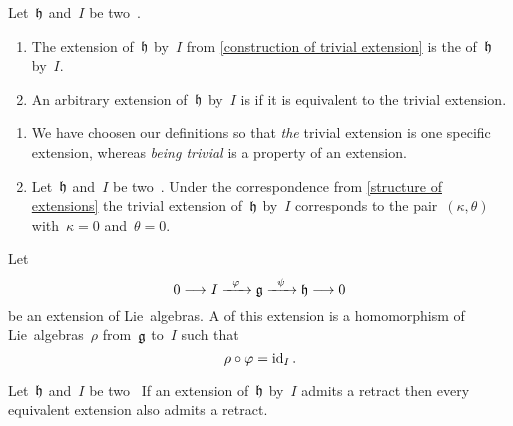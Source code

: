 \begin{definition}
  Let~$\mathfrak{h}$ and~$I$ be two~\liealgebras{$\kf$}.
  \begin{enumerate}
    \item
      The extension of~$\mathfrak{h}$ by~$I$ from \cref{construction of trivial extension} is the  of~$\mathfrak{h}$ by~$I$.
    \item
      An arbitrary extension of~$\mathfrak{h}$ by~$I$ is  if it is equivalent to the trivial extension.
  \end{enumerate}
\end{definition}


\begin{remark}
  \leavevmode
  \begin{enumerate}
    \item
      We have choosen our definitions so that \emph{the} trivial extension is one specific extension, whereas \emph{being trivial} is a property of an extension.
    \item
      Let~$\mathfrak{h}$ and~$I$ be two~\liealgebras{$\kf$}.
      Under the correspondence from \cref{structure of extensions} the trivial extension of~$\mathfrak{h}$ by~$I$ corresponds to the pair~$(\kappa, \theta)$ with~$\kappa = 0$ and~$\theta = 0$.
  \end{enumerate}
\end{remark}


\begin{definition}
  Let
  \[
    0
    \to
    I
    \xto{\varphi}
    \glie
    \xto{\psi}
    \hlie
    \to
    0
  \]
  be an extension of Lie~algebras.
  A   of this extension is a homomorphism of Lie~algebras~$\rho$ from~$\mathfrak{g}$ to~$I$ such that
  \[
    \rho \circ \varphi
    =
    \mathrm{id}_I \,.
  \]
\end{definition}


\begin{lemma}
  \label{having a retract is invariant under equivalence of extensions}
  Let~$\mathfrak{h}$ and~$I$ be two~\liealgebras{$\kf$}
  If an extension of~$\mathfrak{h}$ by~$I$ admits a retract then every equivalent extension also admits a retract.
\end{lemma}


